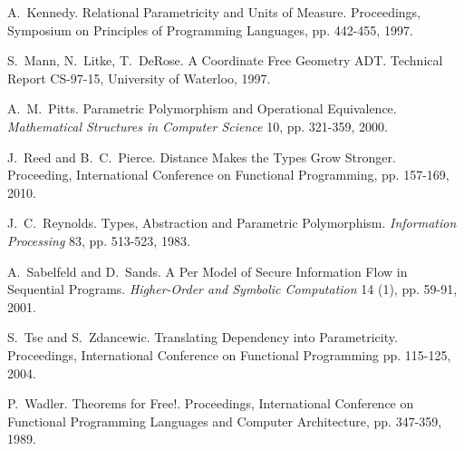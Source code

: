 \documentclass[preprint]{sigplanconf}
\theoremstyle{examplestyle}
\theoremstyle{restatementstyle}
\begin{document}
\begin{thebibliography}{12}
A.~Kennedy. Relational Parametricity and Units of Measure.
Proceedings, Symposium on Principles of Programming Languages,
pp. 442-455, 1997.

S.~Mann, N.~Litke, T.~DeRose.  A Coordinate Free Geometry {ADT}.
Technical Report CS-97-15, University of Waterloo, 1997.

A.~M.~Pitts.  Parametric Polymorphism and Operational Equivalence.
{\em Mathematical Structures in Computer Science} 10, pp. 321-359,
2000.

J.~Reed and B.~C.~Pierce.  Distance Makes the Types Grow Stronger.
Proceeding, International Conference on Functional Programming,
pp. 157-169, 2010.

J.~C.~Reynolds. Types, Abstraction and Parametric Polymorphism.
{\em Information Processing} 83, pp. 513-523, 1983.

A.~Sabelfeld and D.~Sands.  A Per Model of Secure Information Flow in
Sequential Programs.  {\em Higher-Order and Symbolic Computation} 14
(1), pp. 59-91, 2001.

S.~Tse and S.~Zdancewic.  Translating Dependency into Parametricity.
Proceedings, International Conference on Functional Programming pp.
115-125, 2004.

P.~Wadler.  Theorems for Free!.  Proceedings, International Conference
on Functional Programming Languages and Computer Architecture,
pp. 347-359, 1989.

\end{thebibliography}

%
%


% 
\end{document}
